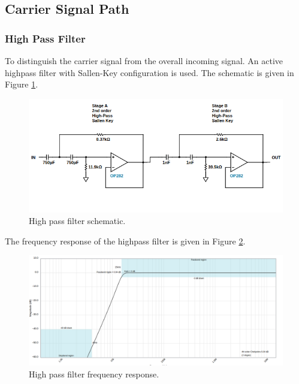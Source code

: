 \documentclass[a4paper,10pt]{IEEEtran}
\begin{document}
\subsection{Carrier Signal Path}
\subsubsection{High Pass Filter}
To distinguish the carrier signal from the overall incoming signal. An active highpass filter with Sallen-Key configuration is used. The schematic is given in Figure \ref{highpass}.
\begin{figure}[htbp!]
    \centering
    \includegraphics[width = 1\linewidth]{active_high_pass_circuit.png}
    \caption{High pass filter schematic. }
    \label{highpass}
\end{figure} 
The frequency response of the highpass filter is given in Figure \ref{highpass_resp}.
\begin{figure}[htbp!]
    \centering
    \includegraphics[width = 1\linewidth]{active_high_pass.png}
    \caption{High pass filter frequency response.}
    \label{highpass_resp}
\end{figure} 
\end{document}
